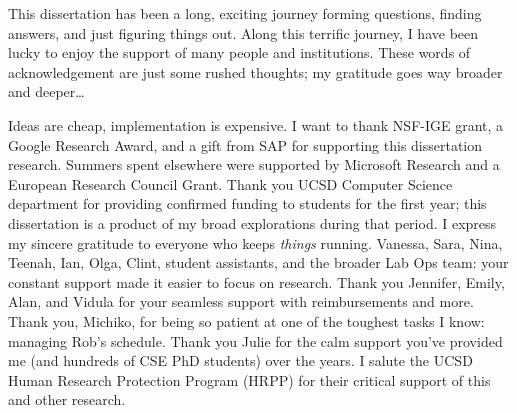 \begin{frontmatter}
\begin{epigraph}
\vspace{10pt}




\end{epigraph}

%


%
\tableofcontents
\listoffigures  %



%
%
\begin{acknowledgements}
This dissertation has been a long, exciting journey forming questions, finding answers, and just figuring things out. Along this terrific journey, I have been lucky to enjoy the support of many people and institutions. These words of acknowledgement are just some rushed thoughts; my gratitude goes way broader and deeper…

Ideas are cheap, implementation is expensive. I want to thank NSF-IGE grant, a Google Research Award, and a gift from SAP for supporting this dissertation research. Summers spent elsewhere were supported by Microsoft Research and a European Research Council Grant. Thank you UCSD Computer Science department for providing confirmed funding to students for the first year; this dissertation is a product of my broad explorations during that period. I express my sincere gratitude to everyone who keeps \textit{things} running. Vanessa, Sara, Nina, Teenah, Ian, Olga, Clint, student assistants, and the broader Lab Ops team: your constant support made it easier to focus on research. Thank you Jennifer, Emily, Alan, and Vidula for your seamless support with reimbursements and more. Thank you, Michiko, for being so patient at one of the toughest tasks I know: managing Rob’s schedule. Thank you Julie for the calm support you’ve provided me (and hundreds of CSE PhD students) over the years. I salute the UCSD Human Research Protection Program (HRPP) for their critical support of this and other research. 


\end{acknowledgements}
\end{frontmatter}
